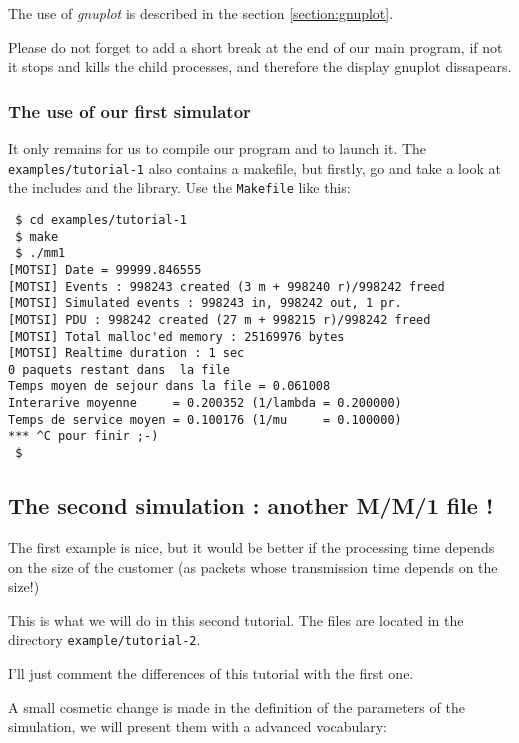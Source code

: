    The use of {\em gnuplot} is described in the section
\ref{section:gnuplot}.

   Please do not forget to add a short break at the end of our main program, if not it stops and kills the child processes, and therefore the display {\rm gnuplot} dissapears.

%
\subsubsection{The use of our first simulator}

   It only remains for us to compile our program and to launch it. The {\tt examples/tutorial-1} also contains a makefile, but firstly, go and take a
look at the includes and the library. Use the {\tt Makefile} like this:

\begin{verbatim}
 $ cd examples/tutorial-1
 $ make
 $ ./mm1
[MOTSI] Date = 99999.846555
[MOTSI] Events : 998243 created (3 m + 998240 r)/998242 freed
[MOTSI] Simulated events : 998243 in, 998242 out, 1 pr.
[MOTSI] PDU : 998242 created (27 m + 998215 r)/998242 freed
[MOTSI] Total malloc'ed memory : 25169976 bytes
[MOTSI] Realtime duration : 1 sec
0 paquets restant dans  la file
Temps moyen de sejour dans la file = 0.061008
Interarive moyenne     = 0.200352 (1/lambda = 0.200000)
Temps de service moyen = 0.100176 (1/mu     = 0.100000)
*** ^C pour finir ;-)
 $
\end{verbatim}

%
\subsection{The second simulation : another M/M/1 file !}

   The first example is nice, but it would be better
if the processing time depends on the size of the customer (as
packets whose transmission time depends on the size!)

   This is what we will do in this second tutorial. The files are located in the directory {\tt example/tutorial-2}.

   I'll just comment the differences of this tutorial with the first one.

   A small cosmetic change is made in the definition of the parameters of the simulation, we will present them with a advanced vocabulary:

